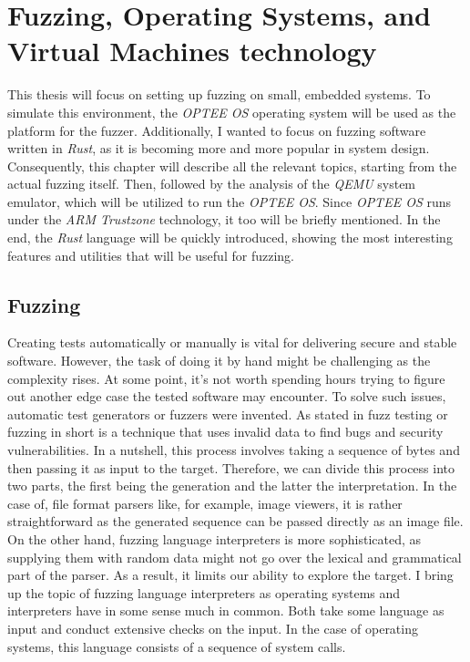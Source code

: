 \cleardoublepage

\section{Fuzzing, Operating Systems, and Virtual Machines technology}

This thesis will focus on setting up fuzzing on small, embedded systems. To simulate this environment, the \textit{OPTEE OS} operating system will be used as the platform for the fuzzer. Additionally, I wanted to focus on fuzzing software written in \textit{Rust}, as it is becoming more and more popular in system design. Consequently, this chapter will describe all the relevant topics, starting from the actual fuzzing itself. Then, followed by the analysis of the \textit{QEMU} system emulator, which will be utilized to run the \textit{OPTEE OS}. Since \textit{OPTEE OS} runs under the \textit{ARM Trustzone} technology, it too will be briefly mentioned. In the end, the \textit{Rust} language will be quickly introduced, showing the most interesting features and utilities that will be useful for fuzzing.

\subsection{Fuzzing} \label{chap:theory}

Creating tests automatically or manually is vital for delivering secure and stable software. However, the task of doing it by hand might be challenging as the complexity rises. At some point, it's not worth spending hours trying to figure out another edge case the tested software may encounter. To solve such issues, automatic test generators or fuzzers were invented. As stated in \cite{fuzzing_state_of_art} fuzz testing or fuzzing in short is a technique that uses invalid data to find bugs and security vulnerabilities. In a nutshell, this process involves taking a sequence of bytes and then passing it as input to the target. Therefore, we can divide this process into two parts, the first being the generation and the latter the interpretation. In the case of, file format parsers like, for example, image viewers, it is rather straightforward as the generated sequence can be passed directly as an image file. On the other hand, fuzzing language interpreters is more sophisticated, as supplying them with random data might not go over the lexical and grammatical part of the parser. As a result, it limits our ability to explore the target. I bring up the topic of fuzzing language interpreters as operating systems and interpreters have in some sense much in common. Both take some language as input and conduct extensive checks on the input. In the case of operating systems, this language consists of a sequence of system calls.


